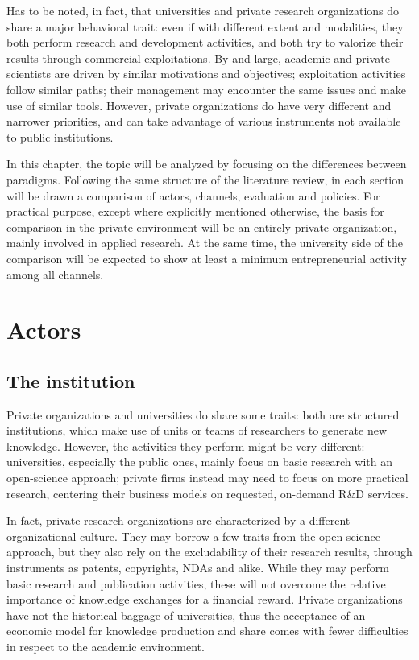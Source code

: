Has to be noted, in fact, that universities and private research organizations do share a major behavioral trait: even if with different extent and modalities, they both perform research and development activities, and both try to valorize their results through commercial exploitations. By and large, academic and private scientists are driven by similar motivations and objectives; exploitation activities follow similar paths; their management may encounter the same issues and make use of similar tools. However, private organizations do have very different and narrower priorities, and can take advantage of various instruments not available to public institutions. 

In this chapter, the topic will be analyzed by focusing on the differences between paradigms. Following the same structure of the literature review, in each section will be drawn a comparison of actors, channels, evaluation and policies. For practical purpose, except where explicitly mentioned otherwise, the basis for comparison in the private environment will be an entirely private organization, mainly involved in applied research. At the same time, the university side of the comparison will be expected to show at least a minimum entrepreneurial activity among all channels. 

\section{Actors}

\subsection{The institution}

Private organizations and universities do share some traits: both are structured institutions, which make use of units or teams of researchers to generate new knowledge. However, the activities they perform might be very different: universities, especially the public ones, mainly focus on basic research with an open-science approach; private firms instead may need to focus on more practical research, centering their business models on requested, on-demand R\&D services.

In fact, private research organizations are characterized by a different organizational culture. They may borrow a few traits from the open-science approach, but they also rely on the excludability of their research results, through instruments as patents, copyrights, NDAs and alike. While they may perform basic research and publication activities, these will not overcome the relative importance of knowledge exchanges for a financial reward. Private organizations have not the historical baggage of universities, thus the acceptance of an economic model for knowledge production and share comes with fewer difficulties in respect to the academic environment.

